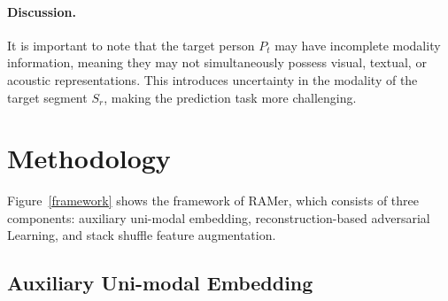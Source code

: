 \paragraph{Discussion.}
It is important to note that the target person $P_{t}$ may have incomplete modality information, meaning they may not simultaneously possess visual, textual, or acoustic representations. This introduces uncertainty in the modality of the target segment $S_{r}$, making the prediction task more challenging.


\section{Methodology}

Figure~\ref{framework} shows the framework of RAMer, which consists of three components: auxiliary uni-modal embedding, reconstruction-based adversarial Learning, and stack shuffle feature augmentation.


\subsection{Auxiliary Uni-modal Embedding}
\label{uni_modal_freature_ext}


